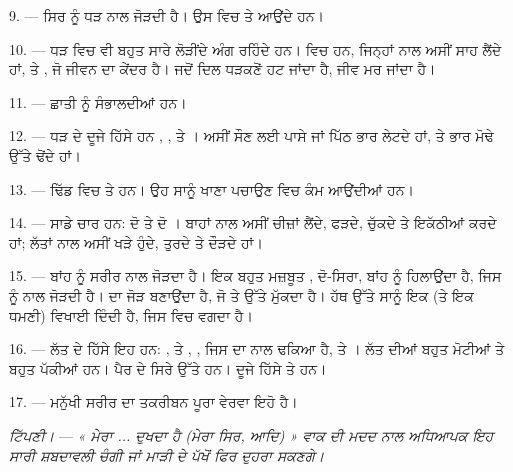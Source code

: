 \VUsaut{4.4mm}
\VUsaut{3.0mm}

9. ---  ਸਿਰ ਨੂੰ ਧੜ ਨਾਲ ਜੋੜਦੀ ਹੈ। ਉਸ ਵਿਚ  ਤੇ
 ਆਉਂਦੇ ਹਨ।

10. --- ਧੜ ਵਿਚ ਵੀ ਬਹੁਤ ਸਾਰੇ ਲੋੜੀਂਦੇ ਅੰਗ ਰਹਿੰਦੇ ਹਨ।  ਵਿਚ
 ਹਨ, ਜਿਨ੍ਹਾਂ ਨਾਲ ਅਸੀਂ ਸਾਹ ਲੈਂਦੇ ਹਾਂ, ਤੇ , ਜੋ ਜੀਵਨ
ਦਾ ਕੇਂਦਰ ਹੈ। ਜਦੋਂ ਦਿਲ ਧੜਕਣੋਂ ਹਟ ਜਾਂਦਾ ਹੈ, ਜੀਵ ਮਰ ਜਾਂਦਾ ਹੈ।

11. ---  ਛਾਤੀ ਨੂੰ ਸੰਭਾਲਦੀਆਂ ਹਨ।

12. --- ਧੜ ਦੇ ਦੂਜੇ ਹਿੱਸੇ ਹਨ , ,  ਤੇ
। ਅਸੀਂ ਸੌਣ ਲਈ ਪਾਸੇ ਜਾਂ ਪਿੱਠ ਭਾਰ ਲੇਟਦੇ ਹਾਂ, ਤੇ ਭਾਰ ਮੋਢੇ ਉੱਤੇ
ਢੋਂਦੇ ਹਾਂ।

13. --- ਢਿੱਡ ਵਿਚ  ਤੇ  ਹਨ। ਉਹ ਸਾਨੂੰ ਖਾਣਾ ਪਚਾਉਣ
ਵਿਚ ਕੰਮ ਆਉਂਦੀਆਂ ਹਨ।

\VUsaut{4.4mm}
\VUsaut{3.0mm}

14. --- ਸਾਡੇ ਚਾਰ  ਹਨ: ਦੋ  ਤੇ ਦੋ ।
ਬਾਹਾਂ ਨਾਲ ਅਸੀਂ ਚੀਜ਼ਾਂ ਲੈਂਦੇ, ਫੜਦੇ, ਚੁੱਕਦੇ ਤੇ ਇਕੱਠੀਆਂ ਕਰਦੇ ਹਾਂ; ਲੱਤਾਂ ਨਾਲ
ਅਸੀਂ ਖੜੇ ਹੁੰਦੇ, ਤੁਰਦੇ ਤੇ ਦੌੜਦੇ ਹਾਂ।

15. ---  ਬਾਂਹ ਨੂੰ ਸਰੀਰ ਨਾਲ ਜੋੜਦਾ ਹੈ। ਇਕ ਬਹੁਤ ਮਜ਼ਬੂਤ
, ਦੋ-ਸਿਰਾ, ਬਾਂਹ ਨੂੰ ਹਿਲਾਉਂਦਾ ਹੈ, ਜਿਸ ਨੂੰ 
 ਨਾਲ ਜੋੜਦੀ ਹੈ।   ਦਾ ਜੋੜ
ਬਣਾਉਂਦਾ ਹੈ, ਜੋ  ਤੇ  ਉੱਤੇ ਮੁੱਕਦਾ ਹੈ। ਹੱਥ ਉੱਤੇ
ਸਾਨੂੰ ਇਕ  (ਤੇ ਇਕ ਧਮਣੀ) ਵਿਖਾਈ ਦਿੰਦੀ ਹੈ, ਜਿਸ ਵਿਚ  ਵਗਦਾ
ਹੈ।

16. --- ਲੱਤ ਦੇ ਹਿੱਸੇ ਇਹ ਹਨ: ,  ਤੇ
, , ਜਿਸ ਦਾ 
 ਨਾਲ ਢਕਿਆ ਹੈ,  ਤੇ । ਲੱਤ ਦੀਆਂ
 ਬਹੁਤ ਮੋਟੀਆਂ ਤੇ ਬਹੁਤ ਪੱਕੀਆਂ ਹਨ। ਪੈਰ ਦੇ ਸਿਰੇ ਉੱਤੇ
 ਹਨ। ਦੂਜੇ ਹਿੱਸੇ  ਤੇ  ਹਨ।

17. --- ਮਨੁੱਖੀ ਸਰੀਰ ਦਾ ਤਕਰੀਬਨ ਪੂਰਾ ਵੇਰਵਾ ਇਹੋ ਹੈ।

\textit{ਟਿੱਪਣੀ।} --- \textit{« ਮੇਰਾ ... ਦੁਖਦਾ ਹੈ (ਮੇਰਾ ਸਿਰ, ਆਦਿ) » ਵਾਕ ਦੀ ਮਦਦ
ਨਾਲ ਅਧਿਆਪਕ ਇਹ ਸਾਰੀ ਸ਼ਬਦਾਵਲੀ ਚੰਗੀ ਜਾਂ ਮਾੜੀ} 
\textit{ਦੇ ਪੱਖੋਂ ਫਿਰ ਦੁਹਰਾ ਸਕਣਗੇ।}

\VUsaut{5.0mm}
\VUsaut{2.4mm}
\VUsaut{3.0mm}

